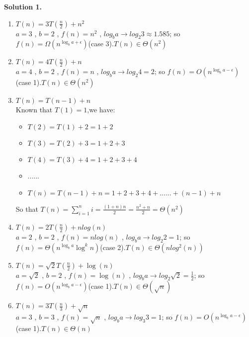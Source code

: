 \documentclass[12pt]{article}
\newcommand{\solution}[1]{\noindent \textbf{Solution #1.}}
\begin{document}
\solution{1}

    \begin{enumerate}
        \item $T(n) = 3T(\frac{n}{2}) + n^2$\\
        $a=3$ , $b=2$ , $f(n) = n^2$ , $log_b a \rightarrow log_2 3 \approx 1.585$; so $f(n) = \Omega(n^{\log_b a + \epsilon})$(case 3).$T(n) \in \Theta(n^2)$

        \item $T(n) = 4T(\frac{n}{2}) + n$\\
        $a=4$ , $b=2$ , $f(n) = n$ , $log_b a \rightarrow log_2 4 = 2$; so $f(n) = O(n^{\log_b a - \epsilon})$(case 1).$T(n) \in \Theta(n^2)$

        \item $T(n) = T(n-1) + n$\\
        Known that $T(1) = 1$,we have:
        \begin{itemize}
            \item $T(2)= T(1) + 2 = 1 + 2$
            \item $T(3)= T(2) + 3 = 1 + 2 + 3$
            \item $T(4)= T(3) + 4 = 1 + 2 + 3 + 4$
            \item ......
            \item $T(n) = T(n-1) + n = 1 + 2 + 3 + 4 +...... + (n-1) + n$
        \end{itemize}
        So that $T(n) = \sum_{i = 1}^{n} i = \frac{(1+n)n}{2} = \frac{n^2+n}{2} = \Theta(n^2)$

        \item $T(n) = 2T(\frac{n}{2}) + n log(n)$\\
        $a=2$ , $b=2$ , $f(n) = nlog(n)$ , $log_b a \rightarrow log_2 2 = 1$; so $f(n) = \Theta \left( n^{\log_b a} \log^k n \right)$(case 2).$T(n) \in \Theta(n log^2 (n))$

        \item $T(n) = \sqrt{2}T(\frac{n}{2}) + \log(n)$\\
        $a=\sqrt{2}$ , $b=2$ , $f(n) = \log(n)$ , $log_b a \rightarrow log_2 \sqrt{2} = \frac{1}{2}$; so $f(n) = O(n^{\log_b a - \epsilon})$(case 1).$T(n) \in \Theta(\sqrt{n})$


        \item $T(n) = 3T(\frac{n}{3}) + \sqrt{n}$\\
        $a=3$ , $b=3$ , $f(n) = \sqrt{n}$ , $log_b a \rightarrow log_3 3 = 1$; so $f(n) = O(n^{\log_b a - \epsilon})$(case 1).$T(n) \in \Theta(n)$


\end{enumerate}
\end{document}
